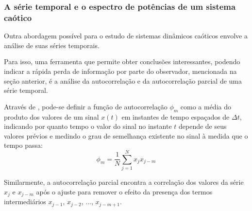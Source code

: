 \documentclass[a4paper, 12pt]{article}
\begin{document}
\subsubsection{A série temporal e o espectro de potências de um sistema caótico}
Outra abordagem possível para o estudo de sistemas dinâmicos caóticos envolve a análise de suas séries temporais. 

Para isso, uma ferramenta que permite obter conclusões interessantes, podendo indicar a rápida perda de informação por parte do observador, mencionada na seção anterior, é a análise da autocorrelação e da autocorrelação parcial de uma série temporal.

Através de \cite{fiedler1994caos}, pode-se definir a função de autocorrelação $\phi_m$ como a média do produto dos valores de um sinal $x(t)$ em instantes de tempo espaçados de $\Delta t$, indicando por quanto tempo o valor do sinal no instante $t$ depende de seus valores prévios e medindo o grau de semelhança existente no sinal à medida que o tempo passa:
\begin{equation}
\phi_m = \frac{1}{N} \sum_{j=1}^{N} x_j x_{j-m}
\end{equation}

Similarmente, a autocorrelação parcial encontra a correlação dos valores da série $x_j$ e $x_{j-m}$ após o ajuste para remover o efeito da presença dos termos intermediários $x_{j-1}$, $x_{j-2}$, ..., $x_{j-m+1}$.
\end{document}
